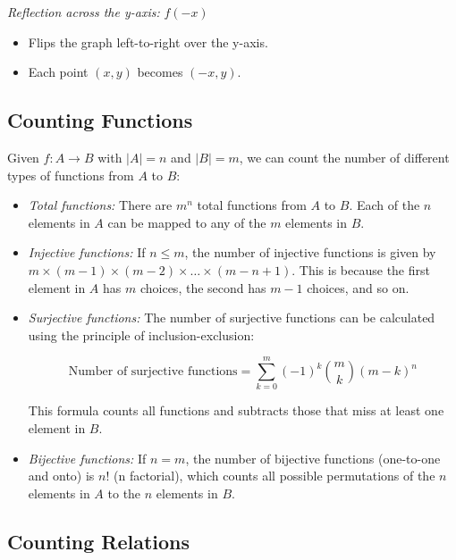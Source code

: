 \emph{Reflection across the y-axis:} \( f(-x) \)

\begin{itemize}

	\item Flips the graph left-to-right over the y-axis.

	\item Each point \( (x, y) \) becomes \( (-x, y) \).

\end{itemize}

\subsection{Counting Functions}

Given \(f: A \to B\) with \(|A| = n\) and \(|B| = m\), we can count the number of different types of functions from 
\(A\) to \(B\):

\begin{itemize}

	\item \emph{Total functions:} There are \(m^n\) total functions from \(A\) to \(B\). Each of the \(n\) elements in 
		  \(A\) can be mapped to any of the \(m\) elements in \(B\).

	\item \emph{Injective functions:} If \(n \leq m\), the number of injective functions is given by 
	\(m \times (m-1) \times (m-2) \times \ldots \times (m-n+1)\). This is because the first element in \(A\) has \(m\) choices, the second has \(m-1\) choices, and so on.

	\item \emph{Surjective functions:} The number of surjective functions can be calculated using the 
		  principle of inclusion-exclusion:
		  
		  \[
			  \text{Number of surjective functions} = \sum_{k=0}^{m} (-1)^k \binom{m}{k} (m-k)^n
		  \]
		  
		  This formula counts all functions and subtracts those that miss at least one element in \(B\). 

	\item \emph{Bijective functions:} If \(n = m\), the number of bijective functions (one-to-one and onto) is 
		  \(n!\) (n factorial), which counts all possible permutations of the \(n\) elements in \(A\) to the \(n\) elements in \(B\).

\end{itemize}

\subsection{Counting Relations}

